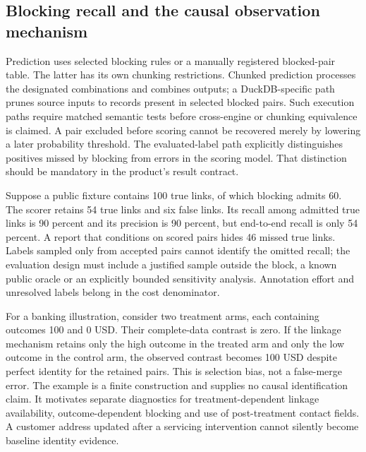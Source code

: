 \subsection{Blocking recall and the causal observation mechanism}
Prediction uses selected blocking rules or a manually registered blocked-pair table. The latter has its own chunking restrictions. Chunked prediction processes the designated combinations and combines outputs; a DuckDB-specific path prunes source inputs to records present in selected blocked pairs. Such execution paths require matched semantic tests before cross-engine or chunking equivalence is claimed. A pair excluded before scoring cannot be recovered merely by lowering a later probability threshold. The evaluated-label path explicitly distinguishes positives missed by blocking from errors in the scoring model. That distinction should be mandatory in the product's result contract.\citep{exec24_splink_sources}

Suppose a public fixture contains 100 true links, of which blocking admits 60. The scorer retains 54 true links and six false links. Its recall among admitted true links is 90 percent and its precision is 90 percent, but end-to-end recall is only 54 percent. A report that conditions on scored pairs hides 46 missed true links. Labels sampled only from accepted pairs cannot identify the omitted recall; the evaluation design must include a justified sample outside the block, a known public oracle or an explicitly bounded sensitivity analysis. Annotation effort and unresolved labels belong in the cost denominator.\citep{exec24_splink_contract}

For a banking illustration, consider two treatment arms, each containing outcomes 100 and 0 USD. Their complete-data contrast is zero. If the linkage mechanism retains only the high outcome in the treated arm and only the low outcome in the control arm, the observed contrast becomes 100 USD despite perfect identity for the retained pairs. This is selection bias, not a false-merge error. The example is a finite construction and supplies no causal identification claim. It motivates separate diagnostics for treatment-dependent linkage availability, outcome-dependent blocking and use of post-treatment contact fields. A customer address updated after a servicing intervention cannot silently become baseline identity evidence.\citep{exec24_splink_contract}

